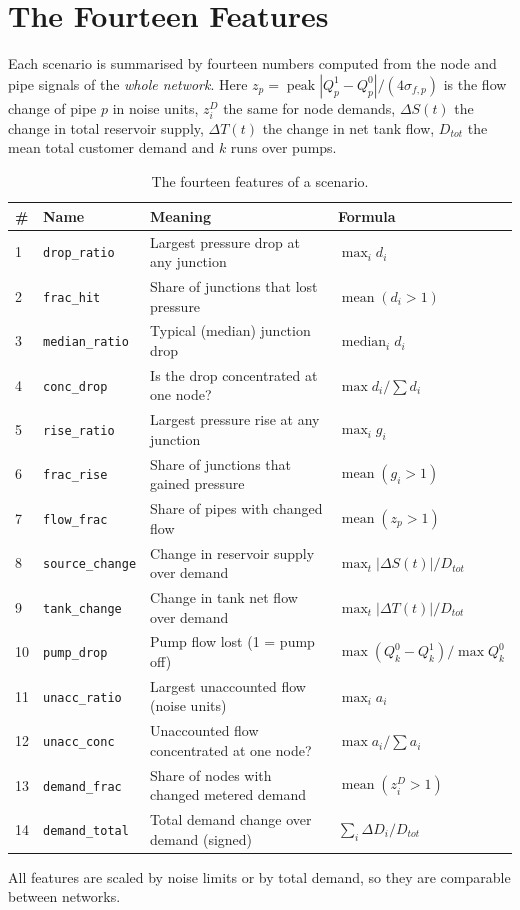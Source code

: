 \documentclass[11pt,letterpaper]{report}
\theoremstyle{definition}
\theoremstyle{plain}
\theoremstyle{remark}
\begin{document}
\section{The Fourteen Features}\label{sec:features}
Each scenario is summarised by fourteen numbers computed from the node and pipe signals of the \emph{whole network}. Here $z_p=\operatorname{peak}|Q^1_p-Q^0_p|/(4\sigma_{f,p})$ is the flow change of pipe $p$ in noise units, $z^D_i$ the same for node demands, $\Delta S(t)$ the change in total reservoir supply, $\Delta T(t)$ the change in net tank flow, $D_{tot}$ the mean total customer demand and $k$ runs over pumps.
\begin{table}[H]
\centering\footnotesize
\caption{The fourteen features of a scenario.}\label{tab:features}
\begin{tabularx}{\textwidth}{@{}p{0.2in}p{1.0in}Yp{1.45in}@{}}
\toprule
\# & Name & Meaning & Formula \\
 & \texttt{drop\_ratio} & Largest pressure drop at any junction & $\max_i d_i$ \\
2 & \texttt{frac\_hit} & Share of junctions that lost pressure & $\operatorname{mean}(d_i>1)$ \\
3 & \texttt{median\_ratio} & Typical (median) junction drop & $\operatorname{median}_i d_i$ \\
4 & \texttt{conc\_drop} & Is the drop concentrated at one node? & $\max d_i/\sum d_i$ \\
5 & \texttt{rise\_ratio} & Largest pressure rise at any junction & $\max_i g_i$ \\
6 & \texttt{frac\_rise} & Share of junctions that gained pressure & $\operatorname{mean}(g_i>1)$ \\
7 & \texttt{flow\_frac} & Share of pipes with changed flow & $\operatorname{mean}(z_p>1)$ \\
8 & \texttt{source\_change} & Change in reservoir supply over demand & $\max_t|\Delta S(t)|/D_{tot}$ \\
9 & \texttt{tank\_change} & Change in tank net flow over demand & $\max_t|\Delta T(t)|/D_{tot}$ \\
10 & \texttt{pump\_drop} & Pump flow lost (1 = pump off) & $\max (Q^0_k-Q^1_k)/\max Q^0_k$ \\
11 & \texttt{unacc\_ratio} & Largest unaccounted flow (noise units) & $\max_i a_i$ \\
12 & \texttt{unacc\_conc} & Unaccounted flow concentrated at one node? & $\max a_i/\sum a_i$ \\
13 & \texttt{demand\_frac} & Share of nodes with changed metered demand & $\operatorname{mean}(z^D_i>1)$ \\
14 & \texttt{demand\_total} & Total demand change over demand (signed) & $\sum_i\Delta D_i/D_{tot}$ \\
\bottomrule
\end{tabularx}
\end{table}
All features are scaled by noise limits or by total demand, so they are comparable between networks.
\end{document}
